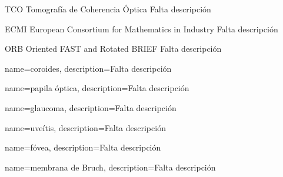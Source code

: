 
  {TCO}            %
  {Tomografía de Coherencia Óptica}  %
  {Falta descripción} %

  {ECMI}            %
  {European Consortium for Mathematics in Industry}  %
  {Falta descripción} %

  {ORB} %
  {Oriented FAST and Rotated BRIEF} %
  {Falta descripción} %

{
  name={coroides},
  description={Falta descripción}
}

{
  name={papila óptica},
  description={Falta descripción}
}

{
  name={glaucoma},
  description={Falta descripción}
}

{
  name={uveítis},
  description={Falta descripción}
}

{
  name={fóvea},
  description={Falta descripción}
}

{
  name={membrana de Bruch},
  description={Falta descripción}
}
